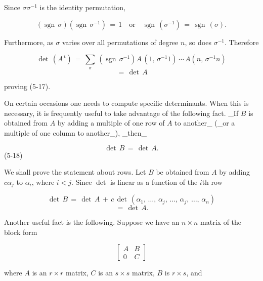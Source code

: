Since \(\sigma\sigma^{-1}\) is the identity permutation,

\[(\operatorname{sgn}\,\sigma)(\operatorname{sgn}\,\sigma^{-1})\,=\,1\quad\text{or} \quad\operatorname{sgn}\,(\sigma^{-1})\,=\,\operatorname{sgn}\,(\sigma).\]

Furthermore, as \(\sigma\) varies over all permutations of degree \(n\), so does \(\sigma^{-1}\). Therefore

\[\det\,(A^{\,t}) \,=\,\sum_{\sigma}\,(\operatorname{sgn}\,\sigma^{-1})A\,(1,\, \sigma^{-1}1)\,\cdots\,A(n,\,\sigma^{-1}n)\] \[\,=\,\det\,A\]

proving (5-17).

On certain occasions one needs to compute specific determinants. When this is necessary, it is frequently useful to take advantage of the following fact. _If \(B\) is obtained from \(A\) by adding a multiple of one row of \(A\) to another_ (_or a multiple of one column to another_), _then_

\[\det\,B\,=\,\det\,A.\] (5-18)

We shall prove the statement about rows. Let \(B\) be obtained from \(A\) by adding \(c\alpha_{j}\) to \(\alpha_{i}\), where \(i<j\). Since \(\det\) is linear as a function of the \(i\)th row

\[\det\,B\,=\,\det\,A\,+\,c\,\det\,(\alpha_{1},\,\ldots,\,\alpha_{j},\,\ldots,\, \alpha_{j},\,\ldots,\,\alpha_{n})\] \[\,=\,\det\,A.\]

Another useful fact is the following. Suppose we have an \(n\times n\) matrix of the block form

\[\begin{bmatrix}A&B\\ 0&C\end{bmatrix}\]

where \(A\) is an \(r\times r\) matrix, \(C\) is an \(s\times s\) matrix, \(B\) is \(r\times s\), and 